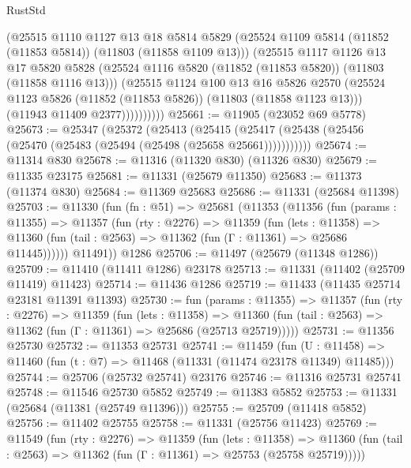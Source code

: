 \begin{lexlean}{RustStd}
\begin{coremodule}
                (@25515
                  @1110
                  @1127
                  @13
                  @18
                  @5814
                  @5829
                  (@25524 @1109 @5814 (@11852 (@11853 @5814)) (@11803 (@11858 @1109 @13)))
                  (@25515
                    @1117
                    @1126
                    @13
                    @17
                    @5820
                    @5828
                    (@25524 @1116 @5820 (@11852 (@11853 @5820)) (@11803 (@11858 @1116 @13)))
                    (@25515
                      @1124
                      @100
                      @13
                      @16
                      @5826
                      @2570
                      (@25524 @1123 @5826 (@11852 (@11853 @5826)) (@11803 (@11858 @1123 @13)))
                      (@11943 @11409 @2377))))))))))
@25661 := @11905 (@23052 @69 @5778)
@25673 := @25347
    (@25372
      (@25413
        (@25415 (@25417 (@25438 (@25456 (@25470 (@25483 (@25494 (@25498 (@25658 @25661)))))))))))
@25674 := @11314 @830
@25678 := @11316 (@11320 @830) (@11326 @830)
@25679 := @11335 @23175
@25681 := @11331 (@25679 @11350)
@25683 := @11373 (@11374 @830)
@25684 := @11369 @25683
@25686 := @11331 (@25684 @11398)
@25703 := @11330
    (fun (fn : @51) =>
    @25681
      (@11353
        (@11356
          (fun (params : @11355) =>
          @11357
            (fun (rty : @2276) =>
            @11359
              (fun (lets : @11358) =>
              @11360 (fun (tail : @2563) => @11362 (fun (Γ : @11361) => @25686 @11445))))))
        @11491))
    @1286
@25706 := @11497 (@25679 (@11348 @1286))
@25709 := @11410 (@11411 @1286) @23178
@25713 := @11331 (@11402 (@25709 @11419) @11423)
@25714 := @11436 @1286
@25719 := @11433 (@11435 @25714 @23181 @11391 @11393)
@25730 := fun (params : @11355) =>
  @11357
    (fun (rty : @2276) =>
    @11359
      (fun (lets : @11358) =>
      @11360 (fun (tail : @2563) => @11362 (fun (Γ : @11361) => @25686 (@25713 @25719)))))
@25731 := @11356 @25730
@25732 := @11353 @25731
@25741 := @11459
    (fun (U : @11458) => @11460 (fun (t : @7) => @11468 (@11331 (@11474 @23178 @11349) @11485)))
@25744 := @25706 (@25732 @25741) @23176
@25746 := @11316 @25731 @25741
@25748 := @11546 @25730 @5852
@25749 := @11383 @5852
@25753 := @11331 (@25684 (@11381 (@25749 @11396)))
@25755 := @25709 (@11418 @5852)
@25756 := @11402 @25755
@25758 := @11331 (@25756 @11423)
@25769 := @11549
    (fun (rty : @2276) =>
    @11359
      (fun (lets : @11358) =>
      @11360 (fun (tail : @2563) => @11362 (fun (Γ : @11361) => @25753 (@25758 @25719)))))

\end{coremodule}
\end{lexlean}
